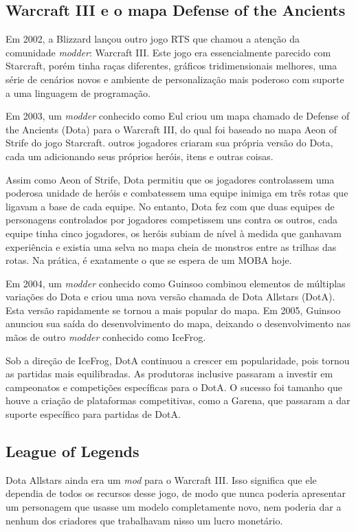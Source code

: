 \subsection{Warcraft III e o mapa Defense of the Ancients}
Em 2002, a Blizzard lançou outro jogo RTS que chamou a atenção da comunidade \textit{modder}: Warcraft III. Este jogo era essencialmente parecido com Starcraft, porém tinha raças diferentes, gráficos tridimensionais melhores, uma série de cenários novos e ambiente de personalização mais poderoso com suporte a uma linguagem de programação.

Em 2003, um \textit{modder} conhecido como Eul criou um mapa chamado de Defense of the Ancients (Dota) para o Warcraft III, do qual foi baseado no mapa Aeon of Strife do jogo Starcraft.  outros jogadores criaram sua própria versão do Dota, cada um adicionando seus próprios heróis, itens e outras coisas.

Assim como Aeon of Strife, Dota permitiu que os jogadores controlassem uma poderosa unidade de heróis e combatessem uma equipe inimiga em três rotas que ligavam a base de cada equipe. No entanto, Dota fez com que duas equipes de personagens controlados por jogadores competissem uns contra os outros, cada equipe tinha cinco jogadores, os heróis subiam de nível à medida que ganhavam experiência e existia uma selva no mapa cheia de monstros entre as trilhas das rotas. Na prática, é exatamente o que se espera de um MOBA hoje.

Em 2004, um \textit{modder} conhecido como Guinsoo combinou elementos de múltiplas variações do Dota e criou uma nova versão chamada de Dota Allstars (DotA). Esta versão rapidamente se tornou a mais popular do mapa. Em 2005, Guinsoo anunciou sua saída do desenvolvimento do mapa, deixando o desenvolvimento nas mãos de outro \textit{modder} conhecido como IceFrog.

Sob a direção de IceFrog, DotA continuou a crescer em popularidade, pois tornou as partidas mais equilibradas. As produtoras inclusive passaram a investir em campeonatos e competições específicas para o DotA. O sucesso foi tamanho que houve a criação de plataformas competitivas, como a Garena, que passaram a dar suporte específico para partidas de DotA.

\subsection{League of Legends}
Dota Allstars ainda era um \textit{mod} para o Warcraft III. Isso significa que ele dependia de todos os recursos desse jogo, de modo que nunca poderia apresentar um personagem que usasse um modelo completamente novo, nem poderia dar a nenhum dos criadores que trabalhavam nisso um lucro monetário.

